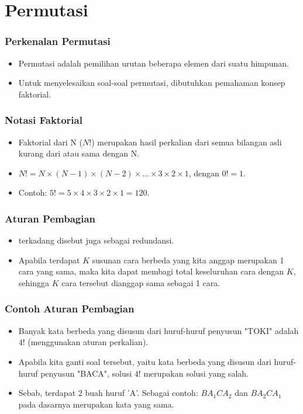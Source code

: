 \section{Permutasi}
\frame{\sectionpage}

\begin{frame}
\frametitle{Perkenalan Permutasi}
\begin{itemize}
  \item Permutasi adalah pemilihan urutan beberapa elemen dari suatu himpunan.
  \item Untuk menyelesaikan soal-soal permutasi, dibutuhkan pemahaman konsep faktorial.
\end{itemize}
\end{frame}

\begin{frame}
\frametitle{Notasi Faktorial}
\begin{itemize}
  \item Faktorial dari N ($N!$) merupakan hasil perkalian dari semua bilangan asli kurang dari atau sama dengan N.
  \item $N! = N \times (N-1) \times (N-2) \times ... \times 3 \times 2 \times 1$, dengan $0! = 1$.
  \item Contoh: $5! = 5 \times 4 \times 3 \times 2 \times 1 = 120$.
\end{itemize}
\end{frame}

\begin{frame}
\frametitle{Aturan Pembagian}
\begin{itemize}
  \item {} terkadang disebut juga sebagai redundansi.
  \item Apabila terdapat $K$ susunan cara berbeda yang kita anggap merupakan 1 cara yang sama, maka kita dapat membagi total keseluruhan cara dengan $K$, sehingga $K$ cara tersebut dianggap sama sebagai 1 cara.
\end{itemize}
\end{frame}

\begin{frame}
\frametitle{Contoh Aturan Pembagian}
\begin{itemize}
  \item Banyak kata berbeda yang disusun dari huruf-huruf penyusun "TOKI" adalah $4!$ (menggunakan aturan perkalian).
  \item Apabila kita ganti soal tersebut, yaitu kata berbeda yang disusun dari huruf-huruf penyusun "BACA", solusi $4!$ merupakan solusi yang salah.
  \item Sebab, terdapat 2 buah huruf 'A'. Sebagai contoh: $BA_{1}CA_{2}$ dan $BA_{2}CA_{1}$ pada dasarnya merupakan kata yang sama.
\end{itemize}
\end{frame}

